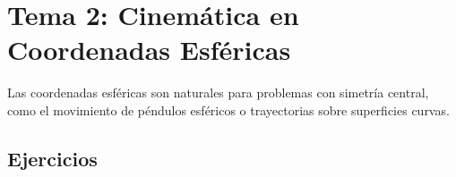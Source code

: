 
\section{Tema 2: Cinemática en Coordenadas Esféricas}

Las coordenadas esféricas son naturales para problemas con simetría central,
como el movimiento de péndulos esféricos o trayectorias sobre superficies curvas.

\subsection{Ejercicios}


\clearpage

\clearpage

\clearpage

\clearpage
